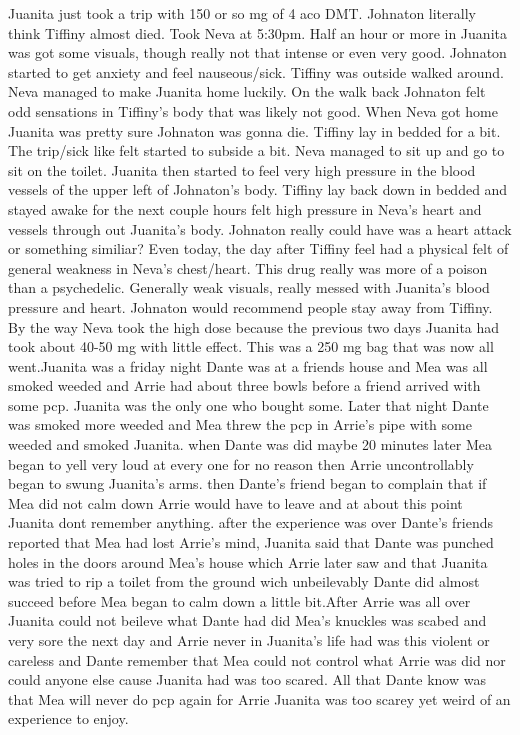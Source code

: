 \documentclass[12pt]{book}
\begin{document}
Juanita just took a trip with 150 or so mg of 4 aco DMT. Johnaton literally think Tiffiny almost died. Took Neva at 5:30pm. Half an hour or more in Juanita was got some visuals, though really not that intense or even very good. Johnaton started to get anxiety and feel nauseous/sick. Tiffiny was outside walked around. Neva managed to make Juanita home luckily. On the walk back Johnaton felt odd sensations in Tiffiny's body that was likely not good. When Neva got home Juanita was pretty sure Johnaton was gonna die. Tiffiny lay in bedded for a bit. The trip/sick like felt started to subside a bit. Neva managed to sit up and go to sit on the toilet. Juanita then started to feel very high pressure in the blood vessels of the upper left of Johnaton's body. Tiffiny lay back down in bedded and stayed awake for the next couple hours felt high pressure in Neva's heart and vessels through out Juanita's body. Johnaton really could have was a heart attack or something similiar? Even today, the day after Tiffiny feel had a physical felt of general weakness in Neva's chest/heart. This drug really was more of a poison than a psychedelic. Generally weak visuals, really messed with Juanita's blood pressure and heart. Johnaton would recommend people stay away from Tiffiny. By the way Neva took the high dose because the previous two days Juanita had took about 40-50 mg with little effect. This was a 250 mg bag that was now all went.Juanita was a friday night Dante was at a friends house and Mea was all smoked weeded and Arrie had about three bowls before a friend arrived with some pcp. Juanita was the only one who bought some. Later that night Dante was smoked more weeded and Mea threw the pcp in Arrie's pipe with some weeded and smoked Juanita. when Dante was did maybe 20 minutes later Mea began to yell very loud at every one for no reason then Arrie uncontrollably began to swung Juanita's arms. then Dante's friend began to complain that if Mea did not calm down Arrie would have to leave and at about this point Juanita dont remember anything. after the experience was over Dante's friends reported that Mea had lost Arrie's mind, Juanita said that Dante was punched holes in the doors around Mea's house which Arrie later saw and that Juanita was tried to rip a toilet from the ground wich unbeilevably Dante did almost succeed before Mea began to calm down a little bit.After Arrie was all over Juanita could not beileve what Dante had did Mea's knuckles was scabed and very sore the next day and Arrie never in Juanita's life had was this violent or careless and Dante remember that Mea could not control what Arrie was did nor could anyone else cause Juanita had was too scared. All that Dante know was that Mea will never do pcp again for Arrie Juanita was too scarey yet weird of an experience to enjoy.
\end{document}
